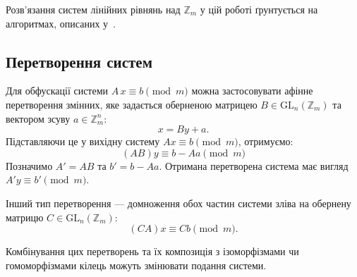 Розв'язання систем лінійних рівнянь над \(\mathbb{Z}_m\) у цій роботі ґрунтується на алгоритмах, описаних у~\cite{Kryvyi21}.

\subsection{Перетворення систем}
\label{subsec:sle_transformations}

Для обфускації системи \(A\,x \equiv b \pmod m\) можна застосовувати афінне перетворення змінних, яке задається оберненою матрицею \(B \in \mathrm{GL}_n(\mathbb{Z}_m)\) та вектором зсуву \(a \in \mathbb{Z}_m^n\):
\[
    x = B y + a.
\]
Підставляючи це у вихідну систему \(Ax \equiv b \pmod m\), отримуємо:
\[
    (A B) y \equiv b - A a \pmod{m}
\]
Позначимо \(A' = A B\) та \(b' = b - A a\).
Отримана перетворена система має вигляд \(A' y \equiv b' \pmod m\).

Інший тип перетворення — домноження обох частин системи зліва на обернену матрицю \(C \in \mathrm{GL}_n(\mathbb{Z}_m)\):
\[
    (C A) x \equiv C b \pmod m.
\]

Комбінування цих перетворень та їх композиція з ізоморфізмами чи гомоморфізмами кілець можуть змінювати подання системи.
